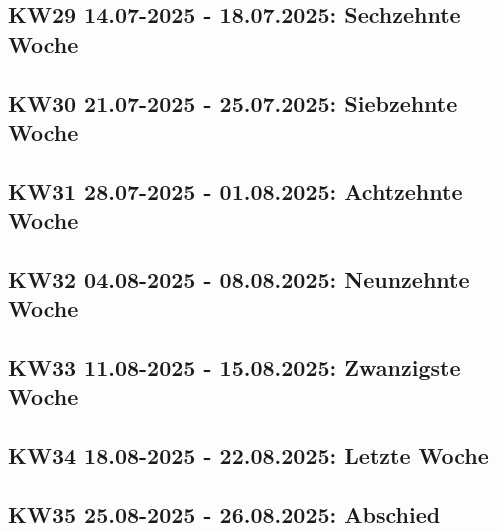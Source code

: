 \subsection{KW29 14.07-2025 - 18.07.2025: Sechzehnte Woche}


\subsection{KW30 21.07-2025 - 25.07.2025: Siebzehnte Woche}


\subsection{KW31 28.07-2025 - 01.08.2025: Achtzehnte Woche}


\subsection{KW32 04.08-2025 - 08.08.2025: Neunzehnte Woche}


\subsection{KW33 11.08-2025 - 15.08.2025: Zwanzigste Woche}


\subsection{KW34 18.08-2025 - 22.08.2025: Letzte Woche}


\subsection{KW35 25.08-2025 - 26.08.2025: Abschied}

